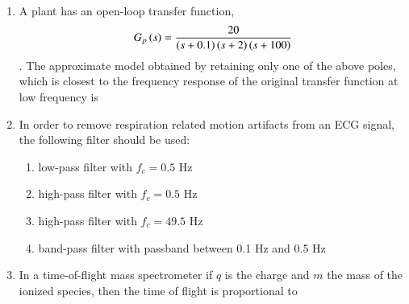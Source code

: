 \documentclass[journal,12pt,onecolumn]{IEEEtran}
\theoremstyle{remark}
\begin{document}
\begin{enumerate}
    \item A plant has an open-loop transfer function, $$G_p\left(s\right) = \frac{20}{\left(s+0.1\right)\left(s+2\right)\left(s+100\right)}$$. The approximate model obtained by retaining only one of the above poles, which is closest to the frequency response of the original transfer function at low frequency is

    \hfill{}
        \begin{enumerate}
        \end{enumerate}

    \item In order to remove respiration related motion artifacts from an ECG signal, the following filter should be used:

    \hfill{}
    \begin{enumerate}
        \item low-pass filter with $f_c = 0.5$ Hz
        \item high-pass filter with $f_c = 0.5$ Hz
        \item high-pass filter with $f_c = 49.5$ Hz
        \item band-pass filter with passband between 0.1 Hz and 0.5 Hz
    \end{enumerate}

    \newpage
    
    \item In a time-of-flight mass spectrometer if $q$ is the charge and $m$ the mass of the ionized species, then the time of flight is proportional to

    \hfill{}
        \begin{enumerate}
        \end{enumerate}

\end{enumerate}
\end{document}
